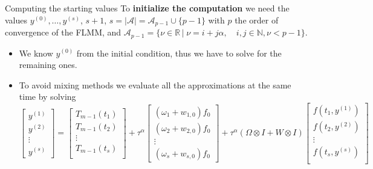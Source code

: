 \documentclass[aspectratio=169,xcolor=dvipsnames]{beamer}
\begin{document}
\begin{frame}{Computing the starting values}\small
To \textbf{initialize the computation} we need the values $y^{(0)},\ldots,y^{(s)}$, $s+1$, $s = |\mathcal{A}| = \mathcal{A}_{p-1} \cup \{p-1\}$ with $p$ the order of convergence of the FLMM, and  $\mathcal{A}_{p-1} = \{ \nu \in \mathbb{R} \,|\; \nu = i + j \alpha, \quad i,j \in \mathbb{N}, \nu < {p-1}\}$.
\begin{itemize}
	\item<2-> We know $y^{(0)}$ from the initial condition, thus we have to solve for the remaining ones.
	\item<3-> To avoid mixing methods we evaluate all the approximations at the same time by solving
	\[
	\begin{bmatrix}
	y^{(1)}\\
	y^{(2)}\\
	\vdots\\
	y^{(s)}
	\end{bmatrix} = \begin{bmatrix}
	T_{m-1}(t_1) \\
	T_{m-1}(t_2) \\
	\vdots \\
	T_{m-1}(t_s) \\
	\end{bmatrix}
	+ \tau^\alpha \begin{bmatrix}
	(\omega_1 + w_{1,0}) f_0 \\
	(\omega_2 + w_{2,0}) f_0 \\
	\vdots \\
	(\omega_s + w_{s,0}) f_0 
	\end{bmatrix}
	+ \tau^\alpha \left( \Omega \otimes I + W \otimes I \right) \begin{bmatrix}
	f(t_1,y^{(1)}) \\
	f(t_2,y^{(2)}) \\
	\vdots \\
	f(t_s,y^{(s)}) \\
	\end{bmatrix}  
	\]
	\only<3>{where
	\[
	\Omega = \begin{bmatrix}
	\omega_0 & \\
	\omega_1 & \omega_0 \\
	\vdots & \vdots & \ddots \\
	\omega_{s-1} & \omega_{s-2} & \cdots & \omega_0 
	\end{bmatrix}, \quad W = \begin{bmatrix}
	w_{1,1} & w_{1,2} & \cdots & w_{1,s} \\
	w_{2,1} & w_{2,2} & \cdots & w_{2,s} \\
	\vdots & \vdots & \ddots & \vdots \\
	w_{s,1} & w_{s,2} & \cdots & w_{s,s} 
	\end{bmatrix}
	\]}
\end{itemize}
\end{frame}
\end{document}
